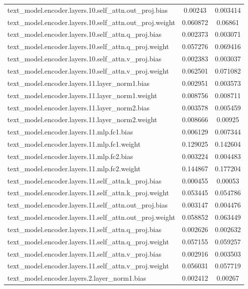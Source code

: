 \begin{longtable}{lcc}
text\_model.encoder.layers.10.self\_attn.out\_proj.bias & 0.00243 & 0.003414 \\
text\_model.encoder.layers.10.self\_attn.out\_proj.weight & 0.060872 & 0.06861 \\
text\_model.encoder.layers.10.self\_attn.q\_proj.bias & 0.002373 & 0.003071 \\
text\_model.encoder.layers.10.self\_attn.q\_proj.weight & 0.057276 & 0.069416 \\
text\_model.encoder.layers.10.self\_attn.v\_proj.bias & 0.002383 & 0.003037 \\
text\_model.encoder.layers.10.self\_attn.v\_proj.weight & 0.062501 & 0.071082 \\
text\_model.encoder.layers.11.layer\_norm1.bias & 0.002951 & 0.003573 \\
text\_model.encoder.layers.11.layer\_norm1.weight & 0.008756 & 0.008711 \\
text\_model.encoder.layers.11.layer\_norm2.bias & 0.003578 & 0.005459 \\
text\_model.encoder.layers.11.layer\_norm2.weight & 0.008666 & 0.00925 \\
text\_model.encoder.layers.11.mlp.fc1.bias & 0.006129 & 0.007344 \\
text\_model.encoder.layers.11.mlp.fc1.weight & 0.129025 & 0.142604 \\
text\_model.encoder.layers.11.mlp.fc2.bias & 0.003224 & 0.004483 \\
text\_model.encoder.layers.11.mlp.fc2.weight & 0.144867 & 0.177204 \\
text\_model.encoder.layers.11.self\_attn.k\_proj.bias & 0.000455 & 0.00053 \\
text\_model.encoder.layers.11.self\_attn.k\_proj.weight & 0.053445 & 0.054786 \\
text\_model.encoder.layers.11.self\_attn.out\_proj.bias & 0.003147 & 0.004476 \\
text\_model.encoder.layers.11.self\_attn.out\_proj.weight & 0.058852 & 0.063449 \\
text\_model.encoder.layers.11.self\_attn.q\_proj.bias & 0.002626 & 0.002632 \\
text\_model.encoder.layers.11.self\_attn.q\_proj.weight & 0.057155 & 0.059257 \\
text\_model.encoder.layers.11.self\_attn.v\_proj.bias & 0.002916 & 0.003503 \\
text\_model.encoder.layers.11.self\_attn.v\_proj.weight & 0.056031 & 0.057719 \\
text\_model.encoder.layers.2.layer\_norm1.bias & 0.002412 & 0.00267 \\

\end{longtable}
